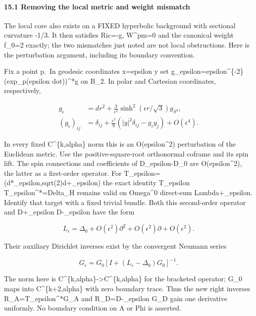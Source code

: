 \documentclass[
  10pt,
]{article}
\begin{document}
\hypertarget{removing-the-local-metric-and-weight-mismatch}{%
\paragraph{15.1 Removing the local metric and weight
mismatch}\label{removing-the-local-metric-and-weight-mismatch}}

The local core also exists on a FIXED hyperbolic background with
sectional curvature -1/3. It then satisfies Ric=-g, W\^{}pm=0 and the
canonical weight f\_0=2 exactly; the two mismatches just noted are not
local obstructions. Here is the perturbation argument, including its
boundary convention.

Fix a point p.~In geodesic coordinates x=epsilon y set
g\_epsilon=epsilon\^{}\{-2\}(exp\_p(epsilon dot))\^{}*g on B\_2. In
polar and Cartesian coordinates, respectively,

\[
\begin{aligned}
 g_\epsilon&=dr^2+\frac3{\epsilon^2}
                    \sinh^2(\epsilon r/\sqrt3)g_{S^3},\\
 (g_\epsilon)_{ij}
  &=\delta_{ij}+\frac{\epsilon^2}{9}
             (|y|^2\delta_{ij}-y_i y_j)+O(\epsilon^4).
\end{aligned}                                                     \tag{15.9}
\]

In every fixed C\^{}\{k,alpha\} norm this is an O(epsilon\^{}2)
perturbation of the Euclidean metric. Use the positive-square-root
orthonormal coframe and its spin lift. The spin connections and
coefficients of D\_epsilon-D\_0 are O(epsilon\^{}2), the latter as a
first-order operator. For T\_epsilon=(d*\_epsilon,sqrt(2)d+\_epsilon)
the exact identity T\_epsilon T\_epsilon\^{}*=Delta\_H remains valid on
Omega\^{}0 direct-sum Lambda+\_epsilon. Identify that target with a
fixed trivial bundle. Both this second-order operator and D+\_epsilon
D-\_epsilon have the form

\[
          L_\epsilon=\Delta_0+O(\epsilon^2)\partial^2
                             +O(\epsilon^2)\partial+O(\epsilon^2).
\]

Their auxiliary Dirichlet inverses exist by the convergent Neumann
series

\[
 G_\epsilon=G_0[I+(L_\epsilon-\Delta_0)G_0]^{-1}.
\]

The norm here is C\^{}\{k,alpha\}-\textgreater C\^{}\{k,alpha\} for the
bracketed operator; G\_0 maps into C\^{}\{k+2,alpha\} with zero boundary
trace. Thus the new right inverses R\_A=T\_epsilon\^{}*G\_A and
R\_D=D-\_epsilon G\_D gain one derivative uniformly. No boundary
condition on A or Phi is asserted.
\end{document}
